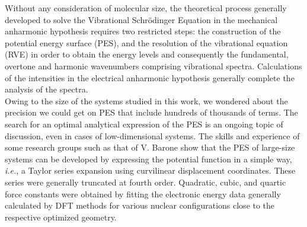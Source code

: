 	Without any consideration of molecular size, the theoretical process generally developed to solve the Vibrational Schrödinger Equation in the mechanical anharmonic hypothesis requires two restricted steps: the construction of the potential energy surface (PES), and the resolution of the vibrational equation (RVE) in order to obtain the energy levels and consequently the fundamental, overtone and harmonic wavenumbers comprising vibrational spectra. Calculations of the intensities in the electrical anharmonic hypothesis generally complete the analysis of the spectra.\\ 
	
	Owing to the size of the systems studied in this work, we wondered about the precision we could get on PES that include hundreds of thousands of terms. The search for an optimal analytical expression of the PES is an ongoing topic of discussion, even in cases of low-dimensional systems. The skills and experience of some research groups such as that of V. Barone \cite{barone2014fully} show that the PES of large-size systems can be developed by expressing the potential function in a simple way, \textit{i.e.}, a Taylor series expansion using curvilinear displacement coordinates. These series were generally truncated at fourth order. Quadratic, cubic, and quartic force constants were obtained by fitting the electronic energy data generally calculated by DFT methods for various nuclear configurations close to the respective optimized geometry.\\  
	
